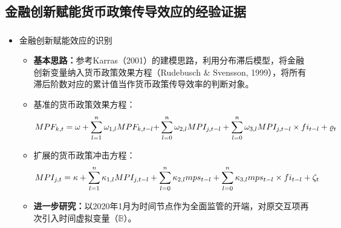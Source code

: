 \documentclass[12pt,aspectratio=169]{ctexbeamer}
\begin{document}
			\subsection{金融创新赋能货币政策传导效应的经验证据}
			\begin{frame}
				\frametitle{}
				\begin{itemize}
					\item 金融创新赋能效应的识别
					\begin{itemize}
						\justifying
						\item \textbf{基本思路：}参考Karras（2001）的建模思路，利用分布滞后模型，将金融创新变量纳入货币政策效果方程（Rudebusch \& Svensson, 1999），将所有滞后阶数对应的累计值当作货币政策传导效率的判断对象。
						\item 基准的货币政策效果方程：
						\vspace{-3mm}
						\[
						MPF_{k,t}=\omega +\sum_{l=1}^n{\omega _{1,l}MPF_{k,t-l}+}\sum_{l=0}^n{\omega _{2,l}MPI_{j,t-l}}+\sum_{l=0}^n{\omega _{3,l}MPI_{j,t-l}}\times fi_{t-l}+\varrho _t
						\vspace{-3mm}
						\]
						\item 扩展的货币政策冲击方程：
						\vspace{-3mm}
						\[
						MPI_{j,t}=\kappa +\sum_{l=1}^n{\kappa _{1,l}MPI_{j,t-l}}+\sum_{l=0}^n{\kappa _{2,l}mps_{t-l}}+\sum_{l=0}^n{\kappa _{3,l}mps_{t-l}\times fi_{t-l}}+\zeta _t
						\vspace{-3mm}
						\]
						\item \textbf{进一步研究：}以2020年1月为时间节点作为全面监管的开端，对原交互项再次引入时间虚拟变量（$\mathbb{B}$）。
					\end{itemize}
				\end{itemize}
			\end{frame}
\end{document}
